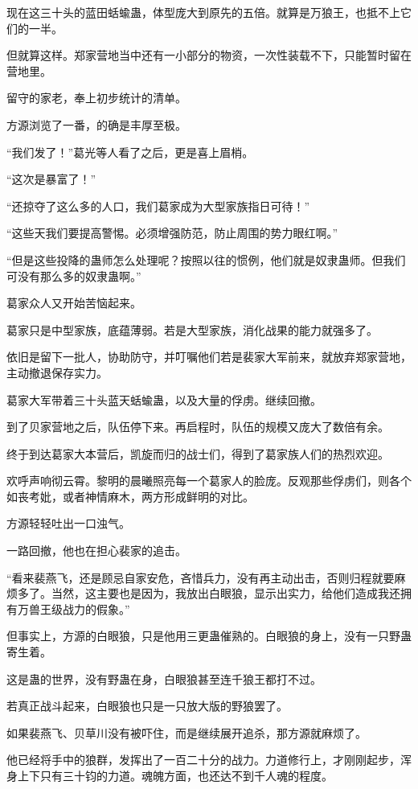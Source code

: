 \begin{this_body}
现在这三十头的蓝田蛞蝓蛊，体型庞大到原先的五倍。就算是万狼王，也抵不上它们的一半。

但就算这样。郑家营地当中还有一小部分的物资，一次性装载不下，只能暂时留在营地里。

留守的家老，奉上初步统计的清单。

方源浏览了一番，的确是丰厚至极。

“我们发了！”葛光等人看了之后，更是喜上眉梢。

“这次是暴富了！”

“还掠夺了这么多的人口，我们葛家成为大型家族指日可待！”

“这些天我们要提高警惕。必须增强防范，防止周围的势力眼红啊。”

“但是这些投降的蛊师怎么处理呢？按照以往的惯例，他们就是奴隶蛊师。但我们可没有那么多的奴隶蛊啊。”

葛家众人又开始苦恼起来。

葛家只是中型家族，底蕴薄弱。若是大型家族，消化战果的能力就强多了。

依旧是留下一批人，协助防守，并叮嘱他们若是裴家大军前来，就放弃郑家营地，主动撤退保存实力。

葛家大军带着三十头蓝天蛞蝓蛊，以及大量的俘虏。继续回撤。

到了贝家营地之后，队伍停下来。再启程时，队伍的规模又庞大了数倍有余。

终于到达葛家大本营后，凯旋而归的战士们，得到了葛家族人们的热烈欢迎。

欢呼声响彻云霄。黎明的晨曦照亮每一个葛家人的脸庞。反观那些俘虏们，则各个如丧考妣，或者神情麻木，两方形成鲜明的对比。

方源轻轻吐出一口浊气。

一路回撤，他也在担心裴家的追击。

“看来裴燕飞，还是顾忌自家安危，吝惜兵力，没有再主动出击，否则归程就要麻烦多了。当然，这主要也是因为，我放出白眼狼，显示出实力，给他们造成我还拥有万兽王级战力的假象。”

但事实上，方源的白眼狼，只是他用三更蛊催熟的。白眼狼的身上，没有一只野蛊寄生着。

这是蛊的世界，没有野蛊在身，白眼狼甚至连千狼王都打不过。

若真正战斗起来，白眼狼也只是一只放大版的野狼罢了。

如果裴燕飞、贝草川没有被吓住，而是继续展开追杀，那方源就麻烦了。

他已经将手中的狼群，发挥出了一百二十分的战力。力道修行上，才刚刚起步，浑身上下只有三十钧的力道。魂魄方面，也还达不到千人魂的程度。


\end{this_body}
